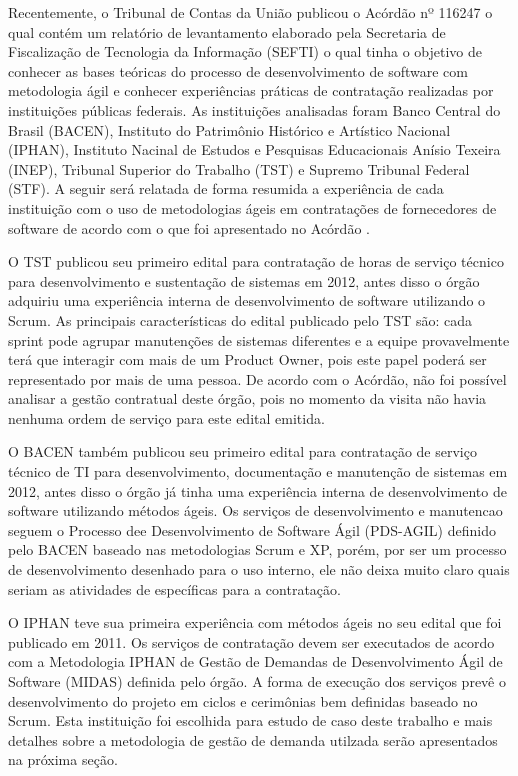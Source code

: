 Recentemente, o Tribunal de Contas da União publicou o Acórdão nº 116247 o qual contém um relatório de levantamento elaborado pela Secretaria de Fiscalização de Tecnologia da Informação (SEFTI) o qual tinha o objetivo de conhecer as bases teóricas do processo de desenvolvimento de software com metodologia ágil e conhecer experiências práticas de contratação realizadas por instituições públicas federais. As instituições analisadas foram Banco Central do Brasil (BACEN), Instituto do Patrimônio Histórico e Artístico Nacional (IPHAN), Instituto Nacinal de Estudos e Pesquisas Educacionais Anísio Texeira (INEP), Tribunal Superior do Trabalho (TST) e Supremo Tribunal Federal (STF). A seguir será relatada de forma resumida a experiência de cada instituição com o uso de metodologias ágeis em contratações de fornecedores de software de acordo com o que foi apresentado no Acórdão  \cite{TCU:2013}.

O TST publicou seu primeiro edital para contratação de horas de serviço técnico para desenvolvimento e sustentação de sistemas em 2012, antes disso o órgão adquiriu uma experiência interna de desenvolvimento de software utilizando o Scrum. As principais características do edital publicado pelo TST são: cada sprint pode agrupar manutenções de sistemas diferentes e a equipe provavelmente terá que interagir com mais de um Product Owner, pois este papel poderá ser representado por mais de uma pessoa. De acordo com o Acórdão, não foi possível analisar a gestão contratual deste órgão, pois no momento da visita não havia nenhuma ordem de serviço para este edital emitida.

O BACEN também publicou seu primeiro edital para contratação de serviço técnico de TI para desenvolvimento, documentação e manutenção de sistemas em 2012, antes disso o órgão já tinha uma experiência interna de desenvolvimento de software utilizando métodos ágeis. Os serviços de desenvolvimento e manutencao seguem o Processo dee Desenvolvimento de Software Ágil (PDS-AGIL) definido pelo BACEN baseado nas metodologias Scrum e XP, porém, por ser um processo de desenvolvimento desenhado para o uso interno, ele não deixa muito claro quais seriam as atividades de específicas para a contratação. 

O IPHAN teve sua primeira experiência com métodos ágeis no seu edital que foi publicado em 2011. Os serviços de contratação devem ser executados de acordo com a Metodologia IPHAN de Gestão de Demandas de Desenvolvimento Ágil de Software (MIDAS) definida pelo órgão. A forma de execução dos serviços prevê o desenvolvimento do projeto em ciclos e cerimônias bem definidas baseado no Scrum. Esta instituição foi escolhida para estudo de caso deste trabalho e mais detalhes sobre a metodologia de gestão de demanda utilzada serão apresentados na próxima seção. 

